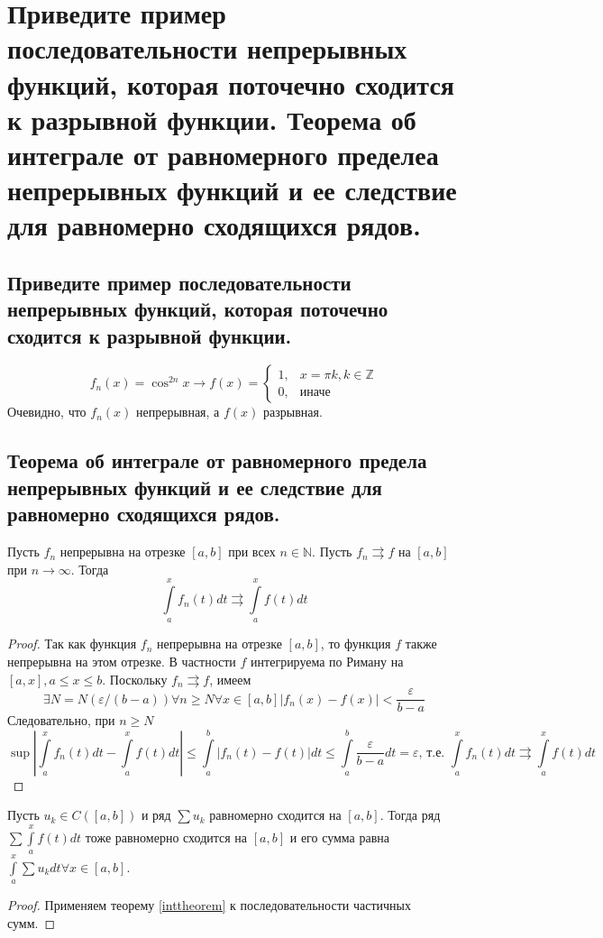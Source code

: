 \section{Приведите пример последовательности непрерывных функций, которая поточечно сходится к разрывной функции. Теорема об интеграле от равномерного пределеа непрерывных функций и ее следствие для равномерно сходящихся рядов.}

\subsection{Приведите пример последовательности непрерывных функций, которая поточечно сходится к разрывной функции.}
\[
    f_n(x) = \cos^{2n} x \to f(x) =
    \begin{cases}
        1, & x = \pi k, k \in \mathbb{Z} \\
        0, & \text{иначе}
    \end{cases}
\]
Очевидно, что $f_n(x)$ непрерывная, а $f(x)$ разрывная.

\subsection{Теорема об интеграле от равномерного предела непрерывных функций и ее следствие для равномерно сходящихся рядов.}
\begin{theorem}\label{inttheorem}
    Пусть $f_n$ непрерывна на отрезке $[a, b]$ при всех $n \in \mathbb{N}$. Пусть $f_n \rightrightarrows f$ на $[a,b]$ при $n \to \infty$. Тогда
    \[
        \int \limits_a^x f_n(t) dt \rightrightarrows \int \limits_a^x f(t) dt
    \]
    \begin{proof}
        Так как функция $f_n$ непрерывна на отрезке $[a, b]$, то функция $f$ также непрерывна на этом отрезке. В частности $f$ интегрируема по Риману на $[a, x], a \leqslant x \leqslant b$. Поскольку $f_n \rightrightarrows f$, имеем
        \[
            \exists N = N(\varepsilon/(b-a))
            \forall n \geqslant N
            \forall x \in [a, b]
            |f_n(x) - f(x)| < \frac{\varepsilon}{b - a}
        \]
        Следовательно, при $n \geqslant N$
        \[
            \sup \left|
                \int \limits_a^x f_n(t) dt - 
                \int \limits_a^x f(t) dt
            \right| \leqslant \int \limits_a^b
            |f_n(t) - f(t)| dt \leqslant
            \int \limits_a^b \frac{\varepsilon}{b - a} dt = \varepsilon
            \text{, т.е. }
            \int \limits_a^x f_n(t) dt \rightrightarrows \int \limits_a^x f(t) dt
        \]
    \end{proof}
\end{theorem}

\begin{theorem}
    Пусть $u_k \in C([a,b])$ и ряд $\sum u_k$ равномерно сходится на $[a,b]$. Тогда ряд $\sum \int \limits_a^x f(t) dt$ тоже равномерно сходится на $[a,b]$ и его сумма равна $\int \limits_a^x \sum u_k dt \forall x \in [a,b]$.
    \begin{proof}
        Применяем теорему \ref{inttheorem} к последовательности частичных сумм.
    \end{proof}
\end{theorem}